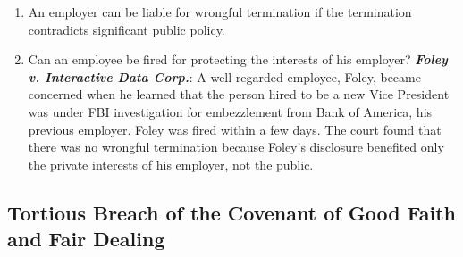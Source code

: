 \begin{enumerate}
    \item An employer can be liable for wrongful termination if the 
    termination contradicts significant public policy.
    \item Can an employee be fired for protecting the interests of his 
    employer? \textbf{\emph{Foley v. Interactive Data Corp.}}: A well-regarded 
    employee, Foley, became concerned when he learned that the person hired to 
    be a new Vice President was under FBI investigation for embezzlement from 
    Bank of America, his previous employer. Foley was fired within a few days. 
    The court found that there was no wrongful termination because Foley's 
    disclosure benefited only the private interests of his employer, not the 
    public.
    

\end{enumerate}

\subsection{Tortious Breach of the Covenant of Good Faith and Fair Dealing}

